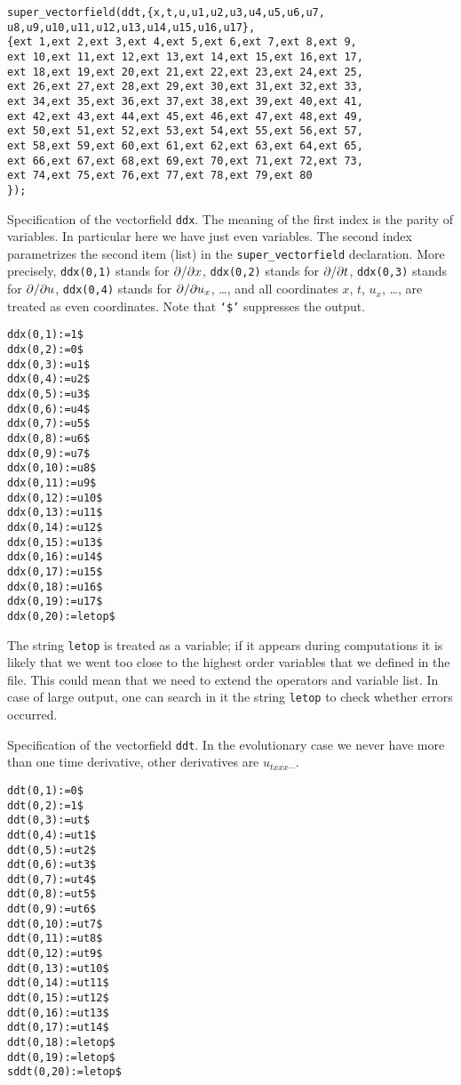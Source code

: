 \begin{verbatim}
super_vectorfield(ddt,{x,t,u,u1,u2,u3,u4,u5,u6,u7,
u8,u9,u10,u11,u12,u13,u14,u15,u16,u17},
{ext 1,ext 2,ext 3,ext 4,ext 5,ext 6,ext 7,ext 8,ext 9,
ext 10,ext 11,ext 12,ext 13,ext 14,ext 15,ext 16,ext 17,
ext 18,ext 19,ext 20,ext 21,ext 22,ext 23,ext 24,ext 25,
ext 26,ext 27,ext 28,ext 29,ext 30,ext 31,ext 32,ext 33,
ext 34,ext 35,ext 36,ext 37,ext 38,ext 39,ext 40,ext 41,
ext 42,ext 43,ext 44,ext 45,ext 46,ext 47,ext 48,ext 49,
ext 50,ext 51,ext 52,ext 53,ext 54,ext 55,ext 56,ext 57,
ext 58,ext 59,ext 60,ext 61,ext 62,ext 63,ext 64,ext 65,
ext 66,ext 67,ext 68,ext 69,ext 70,ext 71,ext 72,ext 73,
ext 74,ext 75,ext 76,ext 77,ext 78,ext 79,ext 80
});
\end{verbatim}

Specification of the vectorfield \texttt{ddx}.  The meaning of the first index
is the parity of variables.  In particular here we have just even variables.
The second index parametrizes the second item (list) in the
\texttt{super\_vectorfield} declaration. More precisely, \texttt{ddx(0,1)}
stands for $\pd{}{x}$, \texttt{ddx(0,2)} stands for $\pd{}{t}$,
\texttt{ddx(0,3)} stands for $\pd{}{u}$, \texttt{ddx(0,4)} stands for
$\pd{}{u_x}$, \dots, and all coordinates $x$, $t$, $u_x$, \dots, are treated as
even coordinates.  Note that \texttt{`\$'} suppresses the output.
\begin{verbatim}
ddx(0,1):=1$
ddx(0,2):=0$
ddx(0,3):=u1$
ddx(0,4):=u2$
ddx(0,5):=u3$
ddx(0,6):=u4$
ddx(0,7):=u5$
ddx(0,8):=u6$
ddx(0,9):=u7$
ddx(0,10):=u8$
ddx(0,11):=u9$
ddx(0,12):=u10$
ddx(0,13):=u11$
ddx(0,14):=u12$
ddx(0,15):=u13$
ddx(0,16):=u14$
ddx(0,17):=u15$
ddx(0,18):=u16$
ddx(0,19):=u17$
ddx(0,20):=letop$
\end{verbatim}
The string \texttt{letop} is treated as a variable; if it appears during
computations it is likely that we went too close to the highest order variables
that we defined in the file. This could mean that we need to extend the
operators and variable list. In case of large output, one can search in it the
string \texttt{letop} to check whether errors occurred.

Specification of the vectorfield \texttt{ddt}. In the evolutionary case we
never have more than one time derivative, other derivatives are
$u_{txxx\cdots}$.
\begin{verbatim}
ddt(0,1):=0$
ddt(0,2):=1$
ddt(0,3):=ut$
ddt(0,4):=ut1$
ddt(0,5):=ut2$
ddt(0,6):=ut3$
ddt(0,7):=ut4$
ddt(0,8):=ut5$
ddt(0,9):=ut6$
ddt(0,10):=ut7$
ddt(0,11):=ut8$
ddt(0,12):=ut9$
ddt(0,13):=ut10$
ddt(0,14):=ut11$
ddt(0,15):=ut12$
ddt(0,16):=ut13$
ddt(0,17):=ut14$
ddt(0,18):=letop$
ddt(0,19):=letop$
sddt(0,20):=letop$
\end{verbatim}

